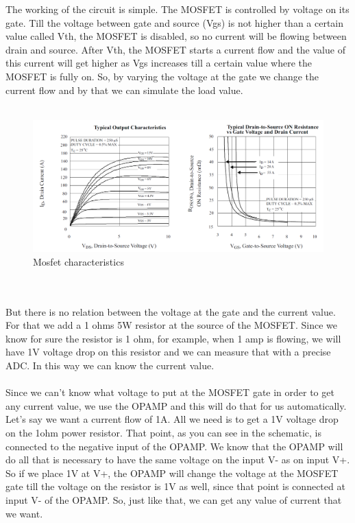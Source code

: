 The working of the circuit is simple. The MOSFET is controlled by voltage on its gate. Till the voltage between gate and source (Vgs) is not higher than a certain value called Vth, the MOSFET is disabled, so no current will be flowing between drain and source. After Vth, the MOSFET starts a current flow and the value of this current will get higher as Vgs increases till a certain value where the MOSFET is fully on. So, by varying the voltage at the gate we change the current flow and by that we can simulate the load value. 
\\ \\
\begin{figure}[h]
	\centering
	\includegraphics[width=\columnwidth]{IMGS/MosfetChara.png}
	\caption{Mosfet characteristics}
	\label{fig:arch}
\end{figure} 
\\ \\	
But there is no relation between the voltage at the gate and the current value. For that we add a 1 ohms 5W resistor at the source of the MOSFET. Since we know for sure the resistor is 1 ohm, for example, when 1 amp is flowing, we will have 1V voltage drop on this resistor and we can measure that with a precise ADC. In this way we can know the current value.
\\ \\
Since we can't know what voltage to put at the MOSFET gate in order to get any current value, we use the OPAMP and this will do that for us automatically. Let's say we want a current flow of 1A. All we need is to get a 1V voltage drop on the 1ohm power resistor. That point, as you can see in the schematic, is connected to the negative input of the OPAMP. We know that the OPAMP will do all that is necessary to have the same voltage on the input V- as on input V+. So if we place 1V at V+, the OPAMP will change the voltage at the MOSFET gate till the voltage on the resistor is 1V as well, since that point is connected at input V- of the OPAMP. So, just like that, we can get any value of current that we want.
